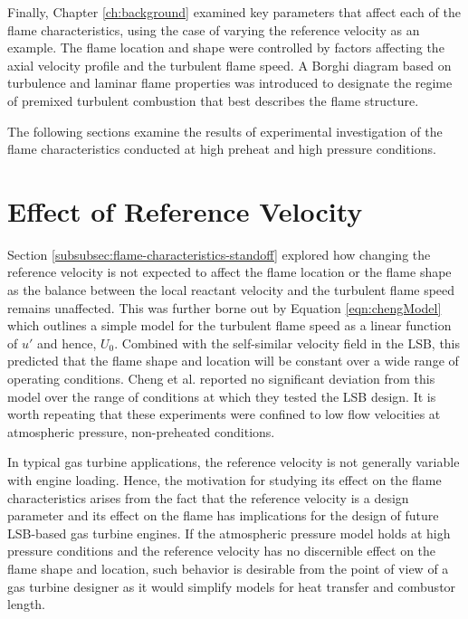 Finally, Chapter \ref{ch:background} examined key parameters that affect each of the flame characteristics, using the case of varying the reference velocity as an example.
The flame location and shape were controlled by factors affecting the axial velocity profile and the turbulent flame speed.
A Borghi diagram based on turbulence and laminar flame properties was introduced to designate the regime of premixed turbulent combustion that best describes the flame structure.

The following sections examine the results of experimental investigation of the flame characteristics conducted at high preheat and high pressure conditions.

\section{Effect of Reference Velocity}
\label{sec:lsb-effect-of-reference-velocity}





Section \ref{subsubsec:flame-characteristics-standoff} explored how changing the reference velocity is not expected to affect the flame location or the flame shape as the balance between the local reactant velocity and the turbulent flame speed remains unaffected.
This was further borne out by Equation \ref{eqn:chengModel} which outlines a simple model for the turbulent flame speed as a linear function of \(u'\) and hence, \(U_0\).
Combined with the self-similar velocity field in the LSB, this predicted that the flame shape and location will be constant over a wide range of operating conditions.
Cheng et al.\cite{2008-cheng-a} reported no significant deviation from this model over the range of conditions at which they tested the LSB design.
It is worth repeating that these experiments were confined to low flow velocities at atmospheric pressure, non-preheated conditions.

In typical gas turbine applications, the reference velocity is not generally variable with engine loading.
Hence, the motivation for studying its effect on the flame characteristics arises from the fact that the reference velocity is a design parameter and its effect on the flame has implications for the design of future LSB-based gas turbine engines.
If the atmospheric pressure model holds at high pressure conditions and the reference velocity has no discernible effect on the flame shape and location, such behavior is desirable from the point of view of a gas turbine designer as it would simplify models for heat transfer and combustor length.

